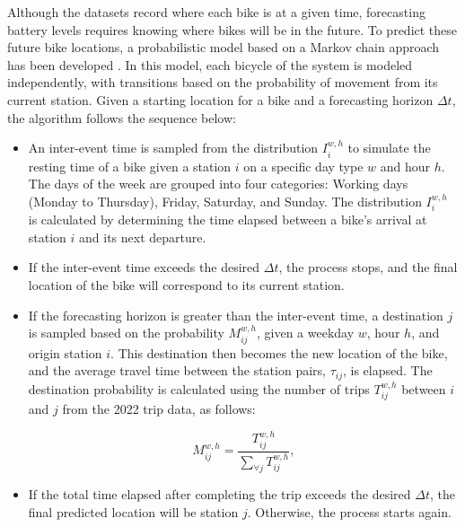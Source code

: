     Although the datasets record where each bike is at a given time, forecasting battery levels requires knowing where bikes will be in the future. To predict these future bike locations, a probabilistic model based on a Markov chain approach has been developed \cite{Lu2013, Huang2015}. In this model, each bicycle of the system is modeled independently, with transitions based on the probability of movement from its current station. Given a starting location for a bike and a forecasting horizon $\Delta t$, the algorithm follows the sequence below:

    \begin{itemize}
        \item An inter-event time is sampled from the distribution $I_i^{w,h}$ to simulate the resting time of a bike given a station $i$ on a specific day type $w$ and hour $h$. The days of the week are grouped into four categories: Working days (Monday to Thursday), Friday, Saturday, and Sunday. The distribution $I_i^{w,h}$ is calculated by determining the time elapsed between a bike’s arrival at station $i$ and its next departure.
        
        \item If the inter-event time exceeds the desired $\Delta t$, the process stops, and the final location of the bike will correspond to its current station. 
        
        \item If the forecasting horizon is greater than the inter-event time, a destination $j$ is sampled based on the probability $M_{ij}^{w,h}$, given a weekday $w$, hour $h$, and origin station $i$. This destination then becomes the new location of the bike, and the average travel time between the station pairs, $\tau_{ij}$, is elapsed. The destination probability is calculated using the number of trips $T_{ij}^{w,h}$ between $i$ and $j$ from the 2022 trip data, as follows:
        
            \begin{equation}
                M_{ij}^{w,h}=\frac{T_{ij}^{w,h}}{\sum_{\forall j} T_{ij}^{w,h}}, 
                \label{eq:destination_probability}
            \end{equation}

        \item If the total time elapsed after completing the trip exceeds the desired $\Delta t$, the final predicted location will be station $j$. Otherwise, the process starts again.
        
    \end{itemize}

